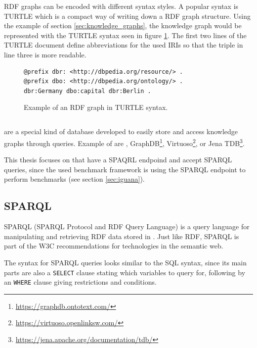 RDF graphs can be encoded with different syntax styles.
A popular syntax is TURTLE \cite{RDFTurtle} which is a compact way of writing down a RDF graph structure.
Using the example of section \ref{sec:knowledge_graphs}, the knowledge graph would be represented with the TURTLE syntax seen in figure \ref{fig:rdf_turtle}.
The first two lines of the TURTLE document define abbreviations for the used IRIs so that the triple in line three is more readable.

\begin{figure}[tbph]
	\begin{lstlisting}
@prefix dbr: <http://dbpedia.org/resource/> .
@prefix dbo: <http://dbpedia.org/ontology/> .
dbr:Germany dbo:capital dbr:Berlin .
	\end{lstlisting}
	\caption{Example of an RDF graph in TURTLE syntax.}
	\label{fig:rdf_turtle}
\end{figure}


\subsection{\ts{}}
\label{sec:triplestores}
\tsp{} are a special kind of database developed to easily store and access knowledge graphs through queries.
Example of \tsp{} are \tentris{}\cite{bigerlTentrisTensorBasedTriple2020}, GraphDB\footnote{\url{https://graphdb.ontotext.com/}}, Virtuoso\footnote{\url{https://virtuoso.openlinksw.com/}}, or Jena TDB\footnote{\url{https://jena.apache.org/documentation/tdb/}}.

This thesis focuses on \tsp{} that have a SPAQRL endpoind and accept SPARQL queries, since the used benchmark framework \iguana{} is using the SPARQL endpoint to perform benchmarks (see section \ref{sec:iguana}).


\subsection{SPARQL}
\label{sec:sparql}
SPARQL (SPARQL Protocol and RDF Query Language)\cite{harrisSPARQLQueryLanguage} is a query language for manipulating and retrieving RDF data stored in \tsp{}.
Just like RDF, SPARQL is part of the W3C recommendations for technologies in the semantic web.

The syntax for SPARQL queries looks similar to the SQL syntax, since its main parts are also a \texttt{SELECT} clause stating which variables to query for, following by an \texttt{WHERE} clause giving restrictions and conditions.

